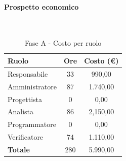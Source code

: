 \documentclass[../PianoProgetto.tex]{subfiles}
\begin{document}
\newpage
	\vfill	
	\paragraph{Prospetto economico}\
	
	\begin{table}[H]
		\centering
		\begin{tabular}{l * {2}{c}}
			\toprule
			\textbf{Ruolo} & \textbf{Ore} & \textbf{Costo (\euro{})} \\
			\midrule
			Responsabile &	33 &  990,00 \\
			Amministratore & 87 &  1.740,00 \\
			Progettista & 0 & 0,00 \\
			Analista & 86 & 2,150,00 \\
			Programmatore & 0 & 0,00 \\
			Verificatore & 74 & 1.110,00 \\
			\midrule		
			\textbf{Totale} & 280 & 5.990,00 \\
			\bottomrule	
		\end{tabular}
		\caption{Fase A - Costo per ruolo}
		\label{tab:faseA_costo}
	\end{table}
\end{document}
